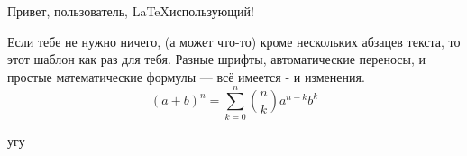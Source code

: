 \documentclass[12pt]{article}
\begin{document}
{\LARGE Привет, пользователь, \LaTeX использующий!}
\bigskip

Если тебе не нужно ничего, (а может что-то) кроме нескольких абзацев текста, то этот шаблон как раз для тебя.
{ Разные шрифты}, автоматические переносы, и простые математические
формулы --- всё имеется - и изменения.
\Large
$$
(a + b)^n = \sum_{k=0}^n{n\choose k}a^{n-k}b^k
$$

\bigskip
{}
угу
\end{document}
